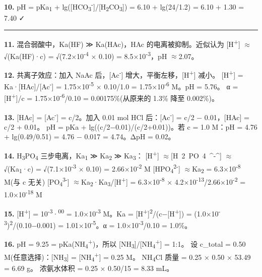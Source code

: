 \documentclass[a4paper,11pt]{ctexart}
\newcommand{\箭}{\ensuremath{\rightarrow}}
\newcommand{\左箭}{\ensuremath{\leftarrow}}
\newcommand{\上箭}{\ensuremath{\uparrow}}
\newcommand{\下箭}{\ensuremath{\downarrow}}
\newcommand{\衡}{\ensuremath{\rightleftharpoons}}
\newcommand{\双箭}{\ensuremath{\leftrightarrow}}
\newcommand{\约等于}{\ensuremath{\approx}}
\newcommand{\小于等于}{\ensuremath{\leq}}
\newcommand{\大于等于}{\ensuremath{\geq}}
\newcommand{\不等于}{\ensuremath{\neq}}
\newcommand{\西格马}{\ensuremath{\sigma}}
\newcommand{\派}{\ensuremath{\pi}}
\begin{document}
\textbf{10.} pH = pKa\textsubscript{1} + lg({[}HCO\textsubscript{3}\textsuperscript{-}{]}/{[}H\textsubscript{2}CO\textsubscript{3}{]}) = 6.10 + lg(24/1.2) = 6.10 + 1.30 = 7.40 ✓

\begin{center}\rule{0.5\linewidth}{0.5pt}\end{center}

\textbf{11.} 混合弱酸中，Ka(HF) ≫ Ka(HAc)，HAc 的电离被抑制。近似认为 {[}H\textsuperscript{+}{]} \约等于 √(Ka(HF)·c) = √(7.2×10\textsuperscript{-4} × 0.10) = 8.5×10\textsuperscript{-3}，pH \约等于 2.07。

\textbf{12.} 共离子效应：加入 NaAc 后，{[}Ac\textsuperscript{-}{]} 增大，平衡左移，{[}H\textsuperscript{+}{]} 减小。
{[}H\textsuperscript{+}{]} = Ka·{[}HAc{]}/{[}Ac\textsuperscript{-}{]} = 1.75×10\textsuperscript{-5} × 0.10/1.0 = 1.75×10\textsuperscript{-6} M。pH = 5.76。
α = {[}H\textsuperscript{+}{]}/c = 1.75×10\textsuperscript{-6}/0.10 = 0.00175\%(从原来的 1.3\% 降至 0.002\%)。

\textbf{13.} {[}HAc{]} = {[}Ac\textsuperscript{-}{]} = c/2。加入 0.01 mol HCl 后：{[}Ac\textsuperscript{-}{]} = c/2 − 0.01，{[}HAc{]} = c/2 + 0.01。
pH = pKa + lg((c/2−0.01)/(c/2+0.01))。若 c = 1.0 M：pH = 4.76 + lg(0.49/0.51) = 4.76 − 0.017 = 4.74。ΔpH = 0.02。

\textbf{14.} H\textsubscript{3}PO\textsubscript{4} 三步电离，Ka\textsubscript{1} ≫ Ka\textsubscript{2} ≫ Ka\textsubscript{3}：
{[}H\textsuperscript{+}{]} \约等于 [H~2~PO~4~^-^] \约等于 √(Ka\textsubscript{1}·c) = √(7.1×10\textsuperscript{-3} × 0.10) = 2.66×10\textsuperscript{-2} M
{[}HPO\textsubscript{4}\textsuperscript{2-}{]} \约等于 Ka\textsubscript{2} = 6.3×10\textsuperscript{-8} M(与 c 无关)
{[}PO\textsubscript{4}\textsuperscript{3-}{]} \约等于 Ka\textsubscript{2}·Ka\textsubscript{3}/{[}H\textsuperscript{+}{]} = 6.3×10\textsuperscript{-8} × 4.2×10\textsuperscript{-13}/2.66×10\textsuperscript{-2} = 1.0×10\textsuperscript{-18} M

\textbf{15.} {[}H\textsuperscript{+}{]} = 10\textsuperscript{-3}·\textsuperscript{00} = 1.0×10\textsuperscript{-3} M。Ka = {[}H\textsuperscript{+}{]}\textsuperscript{2}/(c−{[}H\textsuperscript{+}{]}) = (1.0×10\textsuperscript{-3})\textsuperscript{2}/(0.10−0.001) = 1.01×10\textsuperscript{-5}。α = 1.0×10\textsuperscript{-3}/0.10 = 1.0\%。

\textbf{16.} pH = 9.25 = pKa(NH\textsubscript{4}\textsuperscript{+})，所以 {[}NH\textsubscript{3}{]}/{[}NH\textsubscript{4}\textsuperscript{+}{]} = 1:1。
设 c\_total = 0.50 M(任意选择)：{[}NH\textsubscript{3}{]} = {[}NH\textsubscript{4}\textsuperscript{+}{]} = 0.25 M。
NH\textsubscript{4}Cl 质量 = 0.25 × 0.50 × 53.49 = 6.69 g。
浓氨水体积 = 0.25 × 0.50/15 = 8.33 mL。
\end{document}
